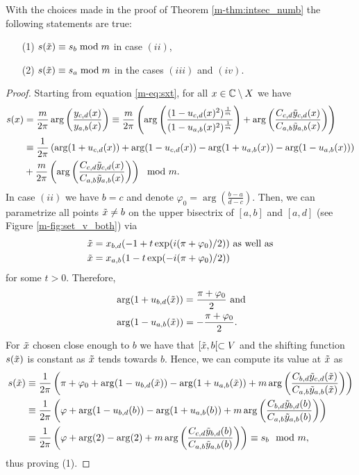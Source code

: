 \documentclass[main.tex]{subfiles}
\begin{document}
\begin{lemma}\label{lemma:sxt=sx}
  With the choices made in the proof of Theorem \ref{m-thm:intsec_numb} the following statements are true:
  \begin{itemize}
   \item[(1)] $s(\tilde{x}) \equiv s_b \bmod m$ in case $(ii)$,
    \item[(2)]  $s(\tilde{x}) \equiv s_a \bmod m$ in the cases $(iii)$ and $(iv)$.
  \end{itemize}
\end{lemma}
 \begin{proof}
 Starting from equation \eqref{m-eq:sxt}, for all $x \in \mathbb{C} \setminus X$ we have
   \begin{align*}
   s(x) & = \frac{m}{2\pi} \arg \left( \frac{y_{c,d}(x)}{y_{a,b}(x)} \right)
   \equiv \frac{m}{2\pi} \left( \arg \left( \frac{(1- u_{c,d}(x)^2)^{\frac{1}{m}}}{(1-u_{a,b}(x)^2)^{\frac{1}{m}}} \right) + \arg \left( \frac{ C_{c,d} \tilde{y}_{c,d}(x)}{C_{a,b}
   \tilde{y}_{a,b}(x)} \right) \right) \\
   & \equiv \frac{1}{2\pi} \left( \arg(1+u_{c,d}(x)) + \arg(1-u_{c,d}(x)) - \arg(1+u_{a,b}(x)) - \arg(1-u_{a,b}(x)) \right) \\
   & +  \frac{m}{2\pi} \left( \arg \left( \frac{ C_{c,d} \tilde{y}_{c,d}(x)}{C_{a,b}\tilde{y}_{a,b}(x)} \right)\right) \mod m.
  \end{align*}
 In case $(ii)$ we have $b = c$ and denote $\varphi_0 = \arg \left( \frac{b-a}{d-c} \right)$. Then, we can parametrize all points $\tilde{x} \ne b$ on 
 the upper bisectrix of $[a,b]$ and
 $[a,d]$ (see Figure \ref{m-fig:set_v_both}) via
 \begin{align*}
  \tilde{x} & = x_{b,d}(-1+t \exp(i(\pi+\varphi_0)/2)) \text{  as well as} \\
  \tilde{x} & = x_{a,b}(1-t \exp(-i (\pi+\varphi_0)/2))
 \end{align*}
 for some $t > 0$. Therefore,
 \begin{align*}
   & \arg (1+u_{b,d}(\tilde{x})) = \frac{\pi+\varphi_0}{2} \text{ and} \\
   & \arg (1-u_{a,b}(\tilde{x})) = -\frac{\pi+\varphi_0}{2}.
 \end{align*}
 For $\tilde{x}$ chosen close enough to $b$ we have that $[\tilde{x},b[ \subset V$ and the shifting function $s(\tilde{x})$ is constant as $\tilde{x}$ tends towards $b$. Hence, 
 we can compute its value at $\tilde{x}$ as
 \begin{align*}
  s(\tilde{x}) & \equiv \frac{1}{2\pi} \left( \pi + \varphi_0 + \arg(1-u_{b,d}(\tilde{x})) - \arg(1+u_{a,b}(\tilde{x})) +  m \arg \left( \frac{ C_{b,d} \tilde{y}_{c,d}(\tilde{x})}{C_{a,b}\tilde{y}_{a,b}(\tilde{x})} \right)\right) \\
	 & \equiv \frac{1}{2\pi} \left ( \varphi +\arg(1-u_{b,d}(b)) - \arg(1+u_{a,b}(b)) +  m \arg \left( \frac{ C_{b,d} \tilde{y}_{b,d}(b)}{C_{a,b}\tilde{y}_{a,b}(b)} \right)\right) \\
	 & \equiv \frac{1}{2\pi} \left( \varphi +\arg(2) - \arg(2) +  m \arg \left( \frac{ C_{c,d} \tilde{y}_{b,d}(b)}{C_{a,b}\tilde{y}_{a,b}(b)} \right)\right) \equiv s_b \mod m,
 \end{align*}
thus proving (1).


\end{proof}
\end{document}
